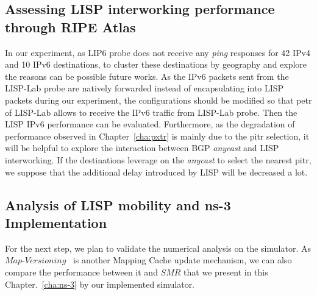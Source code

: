 \subsection{Assessing LISP interworking performance through RIPE Atlas}
In our experiment, as LIP6 probe does not receive any \emph{ping} responses for 42 IPv4 and 10 IPv6 destinations, to cluster these destinations by geography and explore the reasons can be possible future works. As the IPv6 packets sent from the LISP-Lab probe are natively forwarded instead of encapsulating into LISP packets during our experiment, the configurations should be modified so that \acrshort{petr} of LISP-Lab allows to receive the IPv6 traffic from LISP-Lab probe. Then the LISP IPv6 performance can be evaluated. %
Furthermore, as the degradation of performance observed in Chapter~\ref{cha:pxtr} is mainly due to the \acrshort{pitr} selection, it will be helpful to explore the interaction between BGP \emph{anycast} and LISP interworking. If the destinations leverage on the \emph{anycast} to select the nearest \acrshort{pitr}, we suppose that the additional delay introduced by LISP will be decreased a lot.

\subsection{Analysis of LISP mobility and ns-3 Implementation}
For the next step, we plan to validate the numerical analysis on the simulator. As $Map\textbf{-}Versioning$~\cite{rfc6834} is another Mapping Cache update mechanism, we can also compare the performance between it and $SMR$ that we present in this Chapter.~\ref{cha:ns-3} by our implemented simulator. 


